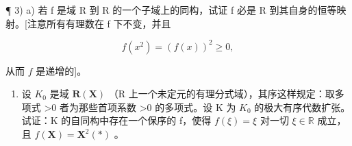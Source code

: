 ¶ 3) a) 若 f 是域 R 到 R 的一个子域上的同构，试证 f 必是 R 到其自身的恒等映射。{[}注意所有有理数在 f 下不变，并且

\[
f (x ^ {2}) = (f (x)) ^ {2} \geqslant 0,
\]

从而 \(f\) 是递增的{]}。

\begin{enumerate}
\def\labelenumi{\alph{enumi})}
\setcounter{enumi}{1}
\tightlist
\item
设 \(K_{0}\) 是域 \(\mathbf{R}(\mathbf{X})\) （R 上一个未定元的有理分式域），其序这样规定：取多项式 \textgreater0 者为那些首项系数 \textgreater0 的多项式。设 K 为 \(K_{0}\) 的极大有序代数扩张。试证：K 的自同构中存在一个保序的 f，使得 \(f(\xi)=\xi\) 对一切 \(\xi\in\mathbb{R}\) 成立，且 \(f(\mathbf{X})=\mathbf{X}^{2}(*)\) 。
\end{enumerate}

